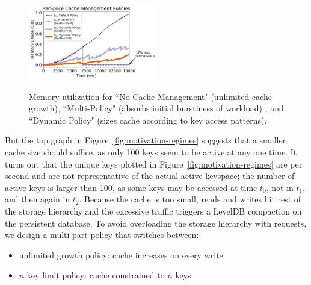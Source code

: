 \begin{figure}[t]
        \centering
        \includegraphics[width=0.5\textwidth]{figures/memory-vs-time.png}\\
	\caption{Memory utilization for ``No Cache Management" (unlimited cache
growth), ``Multi-Policy" (absorbs initial burstiness of workload) , and
``Dynamic Policy" (sizes cache according to key access patterns).
\label{fig:memory-vs-time}}
\end{figure}%
 


%
%

But the top graph in Figure~\ref{fig:motivation-regimes} suggests that a
smaller cache size should suffice, as only 100 keys seem to be active at any
one time.  It turns out that the unique keys plotted in
Figure~\ref{fig:motivation-regimes} are per second and are not representative
of the actual active keyspace; the number of active keys is larger than 100, as
some keys may be accessed at time \(t_0\), not in \(t_1\), and then again in
\(t_2\). Because the cache is too small, reads and writes hit rest of the
storage hierarchy and the excessive traffic triggers a LevelDB compaction on
the persistent database.  To avoid overloading the storage hierarchy with
requests, we design a multi-part policy that switches between:

\begin{itemize}
  \item unlimited growth policy: cache increases on every write
  \item \(n\) key limit policy: cache constrained to \(n\) keys
\end{itemize}

